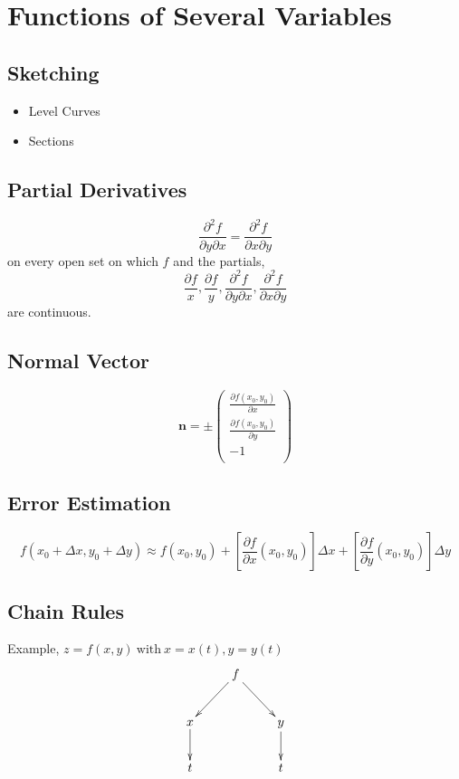 \documentclass[a4paper,10pt]{article}
\begin{document}
\section*{Functions of Several Variables}
\subsection*{Sketching}
\begin{itemize}
\item Level Curves
\item Sections
\end{itemize}

\subsection*{Partial Derivatives}
$$\frac{\partial^2 f}{\partial y \partial x} = \frac{\partial^2 f}{\partial x \partial y}$$
on every open set on which $f$ and the partials,\\
$$\frac{\partial f}{x}, \frac{\partial f}{y}, \frac{\partial^2 f}{\partial y \partial x}, \frac{\partial^2 f}{\partial x \partial y}$$
are continuous.

\subsection*{Normal Vector}
$$\mathbf{n} = \pm 
\begin{pmatrix}
 \frac{\partial f(x_0, y_0)}{\partial x}\\
 \frac{\partial f(x_0, y_0)}{\partial y}\\
 -1\\
\end{pmatrix}
$$

\subsection*{Error Estimation}
$$f(x_0 + \Delta x, y_0 + \Delta y) \approx f(x_0, y_0) + \left[ \frac{\partial f}{\partial x} (x_0, y_0)\right] \Delta x + \left[ \frac{\partial f}{\partial y} (x_0, y_0)\right] \Delta y$$

\subsection*{Chain Rules}
Example, $z = f(x,y)\ \mbox{with}\ x = x(t), y = y(t)$
\begin{displaymath}
    \xymatrix{
                & f \ar[dl] \ar[dr] &   \\
       x \ar[d] &                   & y \ar[d]\\
       t        &                   & t}
\end{displaymath}
\end{document}
